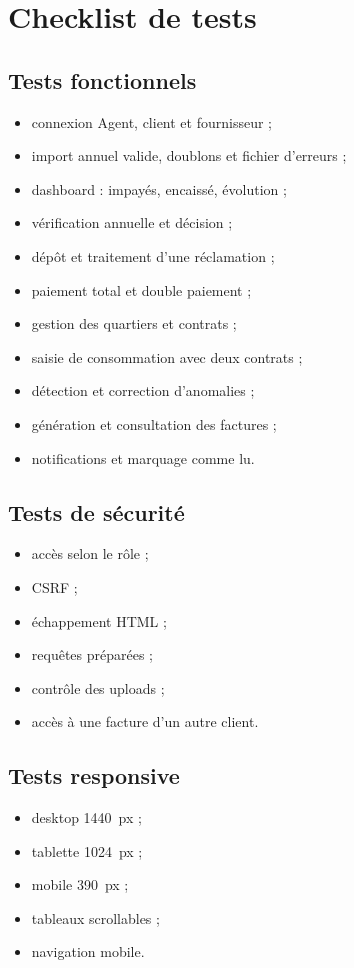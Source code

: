 \chapter{Checklist de tests}

\section{Tests fonctionnels}
\begin{itemize}[leftmargin=*]
  \item connexion Agent, client et fournisseur ;
  \item import annuel valide, doublons et fichier d'erreurs ;
  \item dashboard : impayés, encaissé, évolution ;
  \item vérification annuelle et décision ;
  \item dépôt et traitement d'une réclamation ;
  \item paiement total et double paiement ;
  \item gestion des quartiers et contrats ;
  \item saisie de consommation avec deux contrats ;
  \item détection et correction d'anomalies ;
  \item génération et consultation des factures ;
  \item notifications et marquage comme lu.
\end{itemize}

\section{Tests de sécurité}
\begin{itemize}[leftmargin=*]
  \item accès selon le rôle ;
  \item CSRF ;
  \item échappement HTML ;
  \item requêtes préparées ;
  \item contrôle des uploads ;
  \item accès à une facture d'un autre client.
\end{itemize}

\section{Tests responsive}
\begin{itemize}[leftmargin=*]
  \item desktop 1440~px ;
  \item tablette 1024~px ;
  \item mobile 390~px ;
  \item tableaux scrollables ;
  \item navigation mobile.
\end{itemize}
